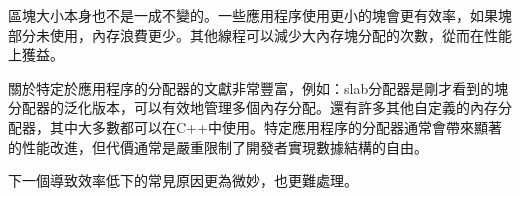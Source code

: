 區塊大小本身也不是一成不變的。一些應用程序使用更小的塊會更有效率，如果塊部分未使用，內存浪費更少。其他線程可以減少大內存塊分配的次數，從而在性能上獲益。

關於特定於應用程序的分配器的文獻非常豐富，例如：slab分配器是剛才看到的塊分配器的泛化版本，可以有效地管理多個內存分配。還有許多其他自定義的內存分配器，其中大多數都可以在C++中使用。特定應用程序的分配器通常會帶來顯著的性能改進，但代價通常是嚴重限制了開發者實現數據結構的自由。

下一個導致效率低下的常見原因更為微妙，也更難處理。





















